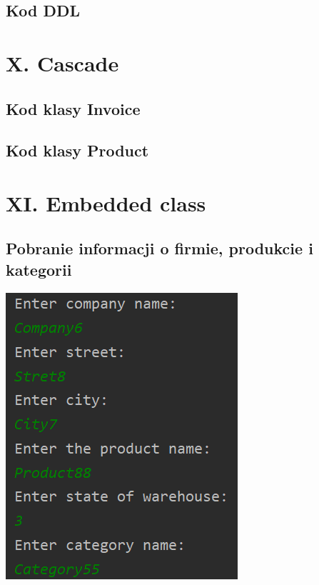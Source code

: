 \documentclass[a4paper, 11pt]{article}
\begin{document}
    \subsection{Kod DDL}
    

    \newpage


    \section{X. Cascade}

    \subsection{Kod klasy Invoice}
    

    \subsection{Kod klasy Product}
    



    \section{XI. Embedded class}

    \subsection{Pobranie informacji o firmie, produkcie i kategorii}
    \begin{center}
        \includegraphics[scale=1.3]{images/point11/addCompanyProductAndCategory.png}
    \end{center}
\end{document}
